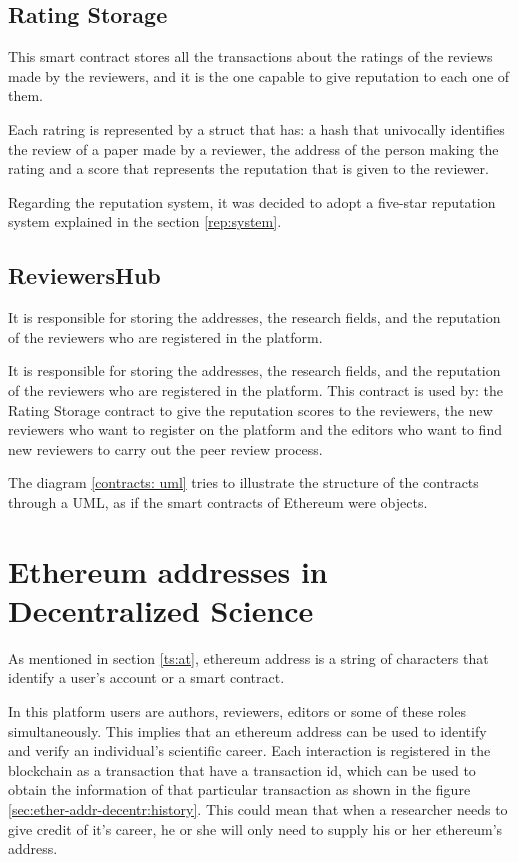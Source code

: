 \subsection*{Rating Storage}

This smart contract stores all the transactions about the ratings of the reviews
made by the reviewers, and it is the one capable to give reputation to each one
of them.

Each ratring is represented by a struct that has: a hash that univocally
identifies the review of a paper made by a reviewer, the address of the person
making the rating and a score that represents the reputation that is given to
the reviewer.

Regarding the reputation system, it was decided to adopt a five-star reputation
system explained in the section \ref{rep:system}.

\subsection*{ReviewersHub}

It is responsible for storing the addresses, the research fields, and the
reputation of the reviewers who are registered in the platform.

It is responsible for storing the addresses, the research fields, and the
reputation of the reviewers who are registered in the platform. This contract is
used by: the Rating Storage contract to give the reputation scores to the
reviewers, the new reviewers who want to register on the platform and the
editors who want to find new reviewers to carry out the peer review process.

The diagram \ref{contracts: uml} tries to illustrate the structure of the
contracts through a UML, as if the smart contracts of Ethereum were objects.

\section{Ethereum addresses in Decentralized Science}
\label{sec:ether-addr-decentr}

As mentioned in section \ref{ts:at}, ethereum address is a string of characters
that identify a user's account or a smart contract.

In this platform users are authors, reviewers, editors or some of these roles
simultaneously. This implies that an ethereum address can be used to identify
and verify an individual's scientific career. Each interaction is registered in
the blockchain as a transaction that have a transaction id, which can be used to
obtain the information of that particular transaction as shown in the figure
\ref{sec:ether-addr-decentr:history}. This could mean that when a researcher
needs to give credit of it's career, he or she will only need to supply his or
her ethereum's address.

